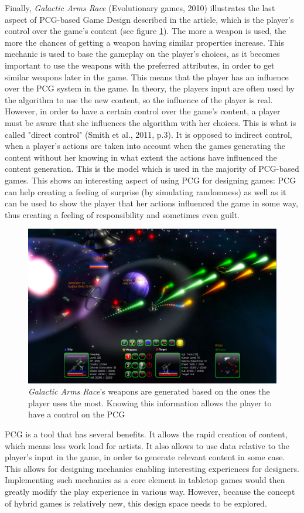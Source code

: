 Finally, \textit{Galactic Arms Race} (Evolutionary games, 2010)\cite{game:gar} illustrates the last aspect of PCG-based Game Design described in the article, which is the player's control over the game's content (see figure \ref{fig:GAR}). The more a weapon is used, the more the chances of getting a weapon having similar properties increase. This mechanic is used to base the gameplay on the player's choices, as it becomes important to use the weapons with the preferred attributes, in order to get similar weapons later in the game. This means that the player has an influence over the PCG system in the game. In theory, the players input are often used by the algorithm to use the new content, so the influence of the player is real. However, in order to have a certain control over the game's content, a player must be aware that she influences the algorithm with her choices. This is what is called "direct control" (Smith et al., 2011, p.3). It is opposed to indirect control, when a player's actions are taken into account when the games generating the content without her knowing in what extent the actions have influenced the content generation. This is the model which is used in the majority of PCG-based games. This shows an interesting aspect of using PCG for designing games: PCG can help creating a feeling of surprise (by simulating randomness) as well as it can be used to show the player that her actions influenced the game in some way, thus creating a feeling of responsibility and sometimes even guilt.
\begin{figure}[h]
    \centering
    \includegraphics[scale=0.2]{Images/GAR.jpg}
    \caption{\textit{Galactic Arms Race}'s weapons are generated based on the ones the player uses the most. Knowing this information allows the player to have a control on the PCG}
    \label{fig:GAR}
\end{figure}
PCG is a tool that has several benefits. It allows the rapid creation of content, which means less work load for artists. It also allows to use data relative to the player's input in the game, in order to generate relevant content in some case. This allows for designing mechanics enabling interesting experiences for designers. Implementing such mechanics as a core element in tabletop games would then greatly modify the play experience in various way. However, because the concept of hybrid games is relatively new, this design space needs to be explored.

